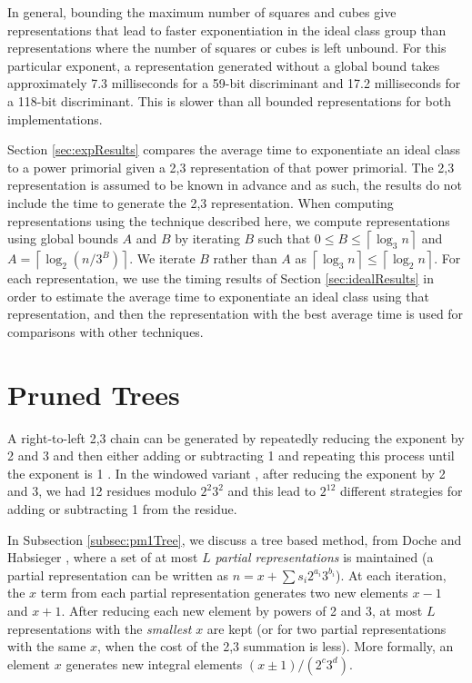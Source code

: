 \documentclass{ucalgthes1}
\theoremstyle{definition}
\newcommand{\ceil}[1]{\left\lceil #1 \right\rceil}
\begin{document}
In general, bounding the maximum number of squares and cubes give representations that lead to faster exponentiation in the ideal class group than representations where the number of squares or cubes is left unbound.  For this particular exponent, a representation generated without a global bound takes approximately 7.3 milliseconds for a 59-bit discriminant and 17.2 milliseconds for a 118-bit discriminant.  This is slower than all bounded representations for both implementations.

Section \ref{sec:expResults} compares the average time to exponentiate an ideal class to a power primorial given a 2,3 representation of that power primorial.  The 2,3 representation is assumed to be known in advance and as such, the results do not include the time to generate the 2,3 representation.  When computing representations using the technique described here, we compute representations using global bounds $A$ and $B$ by iterating $B$ such that $0 \le B \le \ceil{\log_3 n}$ and $A = \ceil{\log_2 (n/3^B)}$.  We iterate $B$ rather than $A$ as $\ceil{\log_3 n} \le \ceil{\log_2 n}$.  For each representation, we use the timing results of Section \ref{sec:idealResults} in order to estimate the average time to exponentiate an ideal class using that representation, and then the representation with the best average time is used for comparisons with other techniques.

\section{Pruned Trees}
\label{sec:expGreedyTrees}

A right-to-left 2,3 chain can be generated by repeatedly reducing the exponent by 2 and 3 and then either adding or subtracting 1 and repeating this process until the exponent is 1 \cite[Figure 8]{Ciet2006}.  In the windowed variant \cite{Doche2006}, after reducing the exponent by 2 and 3, we had 12 residues modulo $2^2 3^2$ and this lead to $2^{12}$ different strategies for adding or subtracting 1 from the residue.

In Subsection \ref{subsec:pm1Tree}, we discuss a tree based method, from Doche and Habsieger \cite{Doche2008}, where a set of at most $L$ \emph{partial representations} is maintained (a partial representation can be written as $n = x + \sum s_i2^{a_i}3^{b_i}$).  At each iteration, the $x$ term from each partial representation generates two new elements $x-1$ and $x+1$.  After reducing each new element by powers of 2 and 3, at most $L$ representations with the \emph{smallest} $x$ are kept (or for two partial representations with the same $x$, when the cost of the 2,3 summation is less).  More formally, an element $x$ generates new integral elements $(x \pm 1)/(2^c3^d)$.
\end{document}
